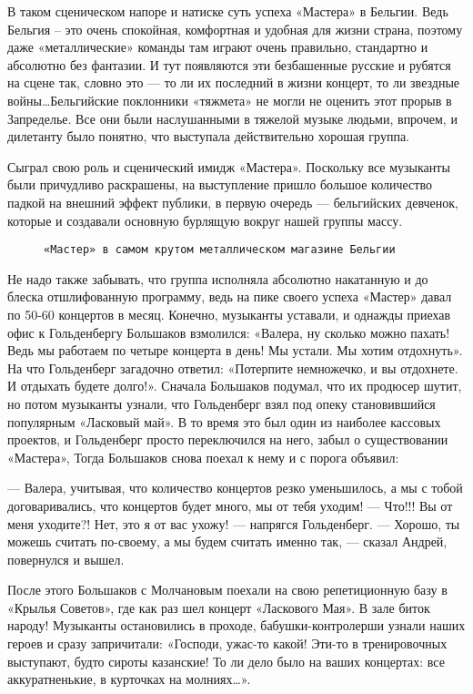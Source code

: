 В таком сценическом напоре и натиске суть успеха «Мастера» в Бельгии. Ведь Бельгия – это очень спокойная, комфортная и
удобная для жизни страна, поэтому даже «металлические» команды там играют очень правильно, стандартно и абсолютно без
фантазии. И тут появляются эти безбашенные русские и рубятся на сцене так, словно это — то ли их последний в жизни
концерт, то ли звездные войны\ldots Бельгийские поклонники «тяжмета» не могли не оценить этот прорыв в Запределье. Все
они были наслушанными в тяжелой музыке людьми, впрочем, и дилетанту было понятно, что выступала действительно хорошая
группа.

Сыграл свою роль и сценический имидж «Мастера». Поскольку все музыканты были причудливо раскрашены, на выступление
пришло большое количество падкой на внешний эффект публики, в первую очередь — бельгийских девченок, которые и создавали
основную бурлящую вокруг нашей группы массу.

\begin{figure}[h]
    \centering
    \caption{\texttt{«Мастер» в самом крутом металлическом магазине Бельгии}}
\end{figure}

Не надо также забывать, что группа исполняла абсолютно накатанную и до блеска отшлифованную программу, ведь на пике
своего успеха «Мастер» давал по 50-60 концертов в месяц. Конечно, музыканты уставали, и однажды приехав офис к
Гольденбергу Большаков взмолился: «Валера, ну сколько можно пахать! Ведь мы работаем по четыре концерта в день! Мы
устали. Мы хотим отдохнуть». На что Гольденберг загадочно ответил: «Потерпите немножечко, и вы отдохнете. И отдыхать
будете долго!». Сначала Большаков подумал, что их продюсер шутит, но потом музыканты узнали, что Гольденберг взял под
опеку становившийся популярным «Ласковый май». В то время это был один из наиболее кассовых проектов, и Гольденберг
просто переключился на него, забыл о существовании «Мастера», Тогда Большаков снова поехал к нему и с порога объявил:

— Валера, учитывая, что количество концертов резко уменьшилось, а мы с тобой договаривались, что концертов будет много,
мы от тебя уходим!
— Что!!! Вы от меня уходите?! Нет, это я от вас ухожу! — напрягся Гольденберг.
— Хорошо, ты можешь считать по-своему, а мы будем считать именно так, — сказал Андрей, повернулся и вышел.

После этого Большаков с Молчановым поехали на свою репетиционную базу в «Крылья Советов», где как раз шел концерт
«Ласкового Мая». В зале биток народу! Музыканты остановились в проходе, бабушки-контролерши узнали наших героев и сразу
запричитали: «Господи, ужас-то какой! Эти-то в тренировочных выступают, будто сироты казанские! То ли дело было на ваших
концертах: все аккуратненькие, в курточках на молниях\ldots».

